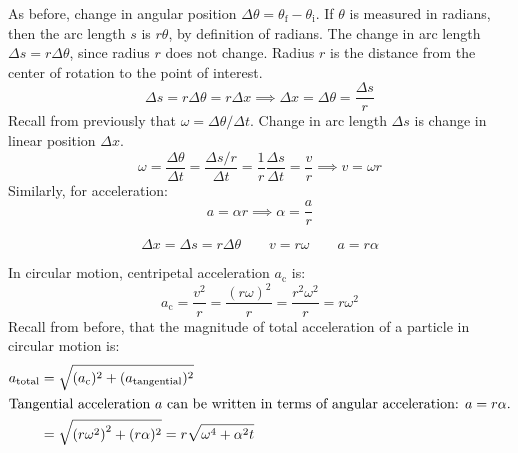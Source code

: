 \documentclass{article}
\newcommand{\theorem}[2]{\begin{tcolorbox}[title={#1},colback=blue!5!white,colframe=blue!75!black,parbox=false] #2 \end{tcolorbox}}
\begin{document}
As before, change in angular position $\Delta \theta=\theta_ \text{f}- \theta_ \text{i}$. If $\theta$ is measured in radians, then the arc length $s$ is $r\theta$, by definition of radians. The change in arc length $\Delta s=r\Delta \theta$, since radius $r$ does not change. Radius $r$ is the distance from the center of rotation to the point of interest.
\begin{equation*}
    \Delta s=r\Delta \theta=r\Delta x
	\implies \Delta x=\Delta \theta=\frac{\Delta s}{r}
\end{equation*}
Recall from previously that $\omega=\Delta \theta/\Delta t$. Change in arc length $\Delta s$ is change in linear position $\Delta x$.
\begin{equation*}
    \omega
	=\frac{\Delta \theta}{\Delta t}
	=\frac{\Delta s/r}{\Delta t}
	=\frac 1r \frac{\Delta s}{\Delta t}
	=\frac{v}{r}
	\implies v=\omega r
\end{equation*}
Similarly, for acceleration:
\begin{equation*}
    a=\alpha r
	\implies 
	\alpha=\frac{a}{r}
\end{equation*}
\theorem{Connection between rotational and linear quantities}{
	\begin{equation*}
		\Delta x=\Delta s=r\Delta \theta
		\qquad
		v=r \omega 
		\qquad
		a=r \alpha
	\end{equation*}
}
In circular motion, centripetal acceleration $a_ \text{c}$ is:
\begin{equation*}
    a_ \text{c}
	=\frac{v^2}{r}
	=\frac{(r\omega)^2}{r}
	=\frac{r^2\omega^2}{r}
	=r\omega^2
\end{equation*}
Recall from before, that the magnitude of total acceleration of a particle in circular motion is:
\begin{align*}
	a_ \text{total}
	&=\sqrt{(a_\text{c})^2+(a_ \text{tangential})^2} \\
	\intertext{Tangential acceleration $a$ can be written in terms of angular acceleration: $a=r\alpha$.}
	&=\sqrt{\left( r\omega^2 \right)^2+(r\alpha)^2}
	=r \sqrt{\omega^4+\alpha^2t}
\end{align*}
\end{document}
